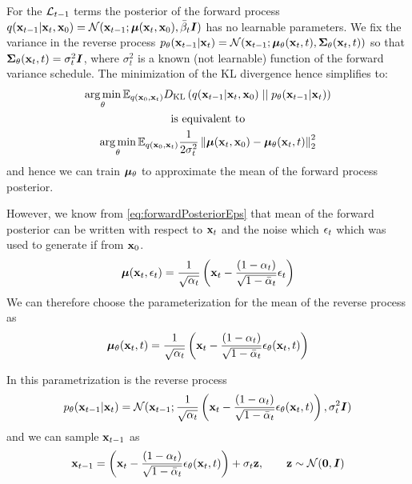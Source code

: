 For the $\mathcal{L}_{t-1}$ terms the posterior of the forward process $q({\mathbf{x}}_{t-1} | {\mathbf{x}}_t, {\mathbf{x}}_0) = \mathcal{N}({\mathbf{x}}_{t-1}; {\bm{\mu}}({\mathbf{x}}_t, {\mathbf{x}}_0), \bar{\beta}_t {\bm{I}})$ has no learnable parameters.
We fix the variance in the reverse process $p_{\theta}({\mathbf{x}}_{t-1} | {\mathbf{x}}_t) = \mathcal{N}({\mathbf{x}}_{t-1}; {\bm{\mu}}_{\theta}({\mathbf{x}}_t, t), {\bm{\Sigma}}_{\theta}({\mathbf{x}}_t, t))$ so that ${\bm{\Sigma}}_{\theta}({\mathbf{x}}_t, t) = \sigma^2_t {\bm{I}}$, where $\sigma^2_t$ is a known (not learnable) function of the forward variance schedule.
The minimization of the KL divergence hence simplifies to:
\begin{gather}\label{eq:Lt-1norm}
    \operatorname*{arg\,min}_{\theta} \mathbb{E}_{q({\mathbf{x}}_0, {\mathbf{x}}_t)} D_{\mathrm{KL}}\left( q({\mathbf{x}}_{t-1} | {\mathbf{x}}_t, {\mathbf{x}}_0) \mid\mid p_{\theta}({\mathbf{x}}_{t-1} | {\mathbf{x}}_t) \right) \nonumber \\
    \text{is equivalent to} \nonumber \\
    \operatorname*{arg\,min}_{\theta} \mathbb{E}_{q({\mathbf{x}}_0, {\mathbf{x}}_t)} \frac{1}{2 \sigma_t^2} \left\lVert{\bm{\mu}}({\mathbf{x}}_t, {\mathbf{x}}_0) - {\bm{\mu}}_{\theta}({\mathbf{x}}_t, t)\right\rVert_2^2
\end{gather}
and hence we can train ${\bm{\mu}}_{\theta}$ to approximate the mean of the forward process posterior.

However, we know from \eqref{eq:forwardPosteriorEps} that mean of the forward posterior can be written with respect to ${\mathbf{x}}_t$ and the noise which ${\mathbf{\epsilon}}_t$ which was used to generate if from ${\mathbf{x}}_0$.
\begin{equation*}
    {\bm{\mu}}({\mathbf{x}}_t, {\mathbf{\epsilon}}_t) = \frac{1}{\sqrt{\alpha_t}} \left( 
        {\mathbf{x}}_t - \frac{(1-\alpha_t)}{\sqrt{1 - \bar{\alpha}_t}} {\mathbf{\epsilon}}_t  \right)  
\end{equation*}
We can therefore choose the parameterization for the mean of the reverse process as
\begin{equation*}
    {\bm{\mu}}_{\theta}({\mathbf{x}}_t, t) = \frac{1}{\sqrt{\alpha_t}} 
    \left( {\mathbf{x}}_t - \frac{(1-\alpha_t)}{\sqrt{1 - \bar{\alpha}_t}} {\mathbf{\epsilon}}_{\theta}({\mathbf{x}}_t, t)  \right)  
\end{equation*}

In this parametrization is the reverse process
\begin{equation*}
    p_{\theta}({\mathbf{x}}_{t-1} | {\mathbf{x}}_t) = \mathcal{N}({\mathbf{x}}_{t-1}; \frac{1}{\sqrt{\alpha_t}} 
    \left( {\mathbf{x}}_t - \frac{(1-\alpha_t)}{\sqrt{1 - \bar{\alpha}_t}} {\mathbf{\epsilon}}_{\theta}({\mathbf{x}}_t, t) \right), \sigma_t^2 {\bm{I}})
\end{equation*}
and we can sample ${\mathbf{x}}_{t-1}$ as
\begin{equation*}
    {\mathbf{x}}_{t-1} = \left( {\mathbf{x}}_t - \frac{(1-\alpha_t)}{\sqrt{1 - \bar{\alpha}_t}} {\mathbf{\epsilon}}_{\theta}({\mathbf{x}}_t, t) \right) + \sigma_t {\mathbf{z}}, \qquad {\mathbf{z}} \sim \mathcal{N}(\mathbf{0}, {\bm{I}})
\end{equation*}

